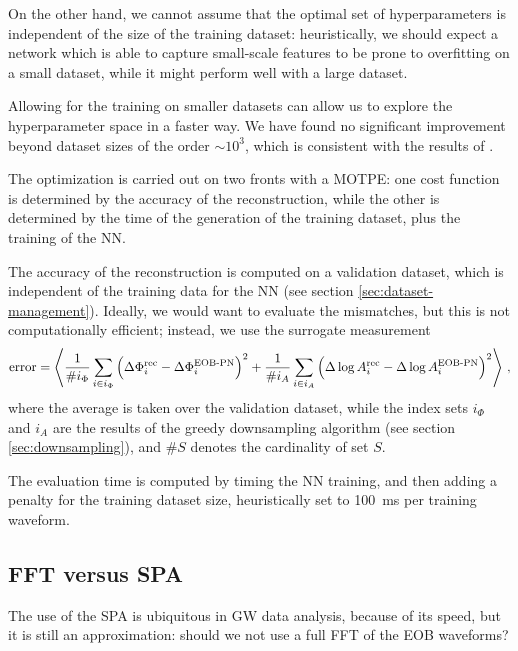 \documentclass[main.tex]{subfiles}
\begin{document}
On the other hand, we cannot assume that the optimal set of hyperparameters is independent of the size of the training dataset: heuristically, we should expect a network which is able to capture small-scale features to be prone to overfitting on a small dataset, while it might perform well with a large dataset. 

Allowing for the training on smaller datasets can allow us to explore the hyperparameter space in a faster way.
We have found no significant improvement beyond dataset sizes of the order \(\sim 10^3\), which is consistent with the results of \textcite{schmidtMachineLearningGravitational2020}.

The optimization is carried out on two fronts with a \ac{MOTPE}: one cost function is determined by the accuracy of the reconstruction, while the other is determined by the time of the generation of the training dataset, plus the training of the \ac{NN}. 

The accuracy of the reconstruction is computed on a validation dataset, which is independent of the training data for the \ac{NN} (see section \ref{sec:dataset-management}). 
Ideally, we would want to evaluate the mismatches, but this is not computationally efficient; instead, we use the surrogate measurement 
%
\begin{align}
\text{error} =\expval{ \frac{1}{\# i_\Phi } \sum _{i \in i_\Phi } \qty(\Delta \Phi ^{\text{rec}}_i - \Delta \Phi ^{\text{EOB-PN}}_i )^2 + \frac{1}{\# i_A} \sum _{i \in i_A} \qty(\Delta \log A ^{\text{rec}}_i - \Delta \log A ^{\text{EOB-PN}}_i)^2}
\,,
\end{align}
%
where the average is taken over the validation dataset, while the index sets \(i_\Phi \) and \(i_A\) are the results of the greedy downsampling algorithm (see section \ref{sec:downsampling}), and \(\# S\) denotes the cardinality of set \(S\). 

The evaluation time is computed by timing the \ac{NN} training, and then adding a penalty for the training dataset size, heuristically set to \SI{100}{ms} per training waveform. 


\subsection{FFT versus SPA}

The use of the \ac{SPA} is ubiquitous in \ac{GW} data analysis, because of its speed, but it is still an approximation: should we not use a full \ac{FFT} of the \ac{EOB} waveforms? 
\end{document}
